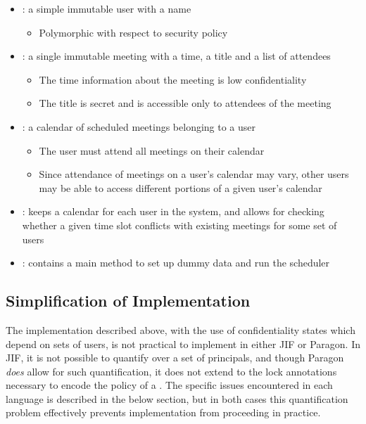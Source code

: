 \begin{itemize}
	
	\item {}: a simple immutable user with a name
	
	\begin{itemize}
		\item Polymorphic with respect to security policy
	\end{itemize}

	\item {}: a single immutable meeting with a time, a title and a list of attendees
	
	\begin{itemize}
		\item The time information about the meeting is low confidentiality
		
		\item The title is secret and is accessible only to attendees of the meeting
	\end{itemize}

	\item {}: a calendar of scheduled meetings belonging to a user

	\begin{itemize}
		\item The user must attend all meetings on their calendar
		
		\item Since attendance of meetings on a user's calendar may vary, other users may be able to access different portions of a given user's calendar
	\end{itemize}
	
	\item {}: keeps a calendar for each user in the system, and allows for checking whether a given time slot conflicts with existing meetings for some set of users
	
	\item {}: contains a main method to set up dummy data and run the scheduler
	
	
\end{itemize}

\subsection{Simplification of Implementation}

The implementation described above, with the use of confidentiality states which depend on sets of users, is not practical to implement in either JIF or Paragon. In JIF, it is not possible to quantify over a set of principals, and though Paragon \textit{does} allow for such quantification, it does not extend to the lock annotations necessary to encode the policy of a . The specific issues encountered in each language is described in the below section, but in both cases this quantification problem effectively prevents implementation from proceeding in practice.


